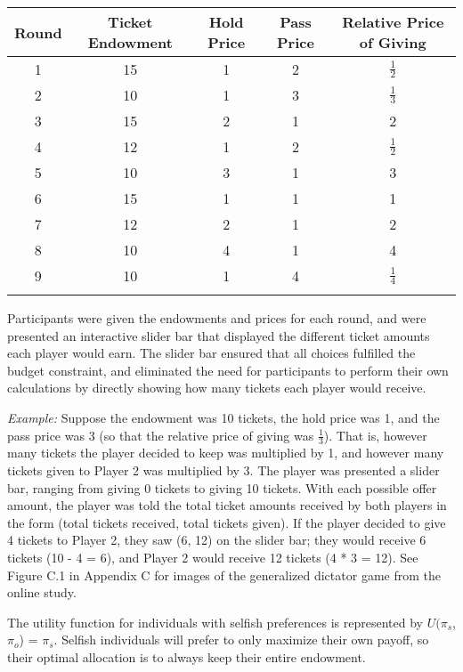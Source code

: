 \documentclass[12pt]{article}
\begin{document}
\begin{center}
\begin{tabular}{ c c c c c }
\hline \hline
 Round & Ticket Endowment & Hold Price & Pass Price & Relative Price of Giving \\ 
 \hline
1 & 15 & 1 & 2 & \(\frac{1}{2}\)  \\  
2 & 10 & 1 & 3 & \(\frac{1}{3}\)  \\  
3 & 15 & 2 & 1 & 2 \\  
4 & 12 & 1 & 2 & \(\frac{1}{2}\)  \\  
5 & 10 & 3 & 1 & 3  \\  
6 & 15 & 1 & 1 & 1  \\  
7 & 12 & 2 & 1 & 2 \\  
8 & 10 & 4 & 1 & 4 \\  
9 & 10 & 1 & 4 & \(\frac{1}{4}\)  \\ 
\hline \hline \\
\end{tabular}
\end{center}

Participants were given the endowments and prices for each round, and were presented an interactive slider bar that displayed the different ticket amounts each player would earn. The slider bar ensured that all choices fulfilled the budget constraint, and eliminated the need for participants to perform their own calculations by directly showing how many tickets each player would receive.

\textit{Example:} Suppose the endowment was 10 tickets, the hold price was 1, and the pass price was 3 (so that the relative price of giving was \(\frac{1}{3}\)). That is, however many tickets the player decided to keep was multiplied by 1, and however many tickets given to Player 2 was multiplied by 3. The player was presented a slider bar, ranging from giving 0 tickets to giving 10 tickets. With each possible offer amount, the player was told the total ticket amounts received by both players in the form (total tickets received, total tickets given). If the player decided to give 4 tickets to Player 2, they saw (6, 12) on the slider bar; they would receive 6 tickets (10 - 4 = 6), and Player 2 would receive 12 tickets (4 * 3 = 12). See Figure C.1 in Appendix C for images of the generalized dictator game from the online study.

The utility function for individuals with selfish preferences is represented by \(U(\pi_{s}\), \(\pi_{o}\)) = \(\pi_{s}\). Selfish individuals will prefer to only maximize their own payoff, so their optimal allocation is to always keep their entire endowment.
\end{document}
